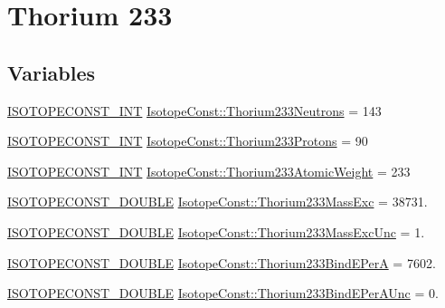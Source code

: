 \hypertarget{group___isotope_const-_thorium-_th233}{}\section{Thorium 233}
\label{group___isotope_const-_thorium-_th233}
\subsection*{Variables}
\begin{DoxyCompactItemize}
\item 
\mbox{\hyperlink{group___isotope_const-_macros_ga5f18360b3e99483a35c32d789e62621c}{I\+S\+O\+T\+O\+P\+E\+C\+O\+N\+S\+T\+\_\+\+I\+NT}} \mbox{\hyperlink{group___isotope_const-_thorium-_th233_ga5639b3a1acfbee5b19fce29b91d47fe0}{Isotope\+Const\+::\+Thorium233\+Neutrons}} = 143
\item 
\mbox{\hyperlink{group___isotope_const-_macros_ga5f18360b3e99483a35c32d789e62621c}{I\+S\+O\+T\+O\+P\+E\+C\+O\+N\+S\+T\+\_\+\+I\+NT}} \mbox{\hyperlink{group___isotope_const-_thorium-_th233_ga7d432317e07d429d1b7b385f96773015}{Isotope\+Const\+::\+Thorium233\+Protons}} = 90
\item 
\mbox{\hyperlink{group___isotope_const-_macros_ga5f18360b3e99483a35c32d789e62621c}{I\+S\+O\+T\+O\+P\+E\+C\+O\+N\+S\+T\+\_\+\+I\+NT}} \mbox{\hyperlink{group___isotope_const-_thorium-_th233_ga142fc672291f7cb40663ffbd5564dbb6}{Isotope\+Const\+::\+Thorium233\+Atomic\+Weight}} = 233
\item 
\mbox{\hyperlink{group___isotope_const-_macros_ga8f45a7272ce02c0b4c65c44636ed719a}{I\+S\+O\+T\+O\+P\+E\+C\+O\+N\+S\+T\+\_\+\+D\+O\+U\+B\+LE}} \mbox{\hyperlink{group___isotope_const-_thorium-_th233_gabca007e006ad682f1c1d94c09aa1792d}{Isotope\+Const\+::\+Thorium233\+Mass\+Exc}} = 38731.
\item 
\mbox{\hyperlink{group___isotope_const-_macros_ga8f45a7272ce02c0b4c65c44636ed719a}{I\+S\+O\+T\+O\+P\+E\+C\+O\+N\+S\+T\+\_\+\+D\+O\+U\+B\+LE}} \mbox{\hyperlink{group___isotope_const-_thorium-_th233_ga4765108823de294d8508c67279247a42}{Isotope\+Const\+::\+Thorium233\+Mass\+Exc\+Unc}} = 1.
\item 
\mbox{\hyperlink{group___isotope_const-_macros_ga8f45a7272ce02c0b4c65c44636ed719a}{I\+S\+O\+T\+O\+P\+E\+C\+O\+N\+S\+T\+\_\+\+D\+O\+U\+B\+LE}} \mbox{\hyperlink{group___isotope_const-_thorium-_th233_ga4a86657f33b71720dbc2d789277b88e2}{Isotope\+Const\+::\+Thorium233\+Bind\+E\+PerA}} = 7602.
\item 
\mbox{\hyperlink{group___isotope_const-_macros_ga8f45a7272ce02c0b4c65c44636ed719a}{I\+S\+O\+T\+O\+P\+E\+C\+O\+N\+S\+T\+\_\+\+D\+O\+U\+B\+LE}} \mbox{\hyperlink{group___isotope_const-_thorium-_th233_gaa6a97500c218a232d0295fded53076c9}{Isotope\+Const\+::\+Thorium233\+Bind\+E\+Per\+A\+Unc}} = 0.

\end{DoxyCompactItemize}
